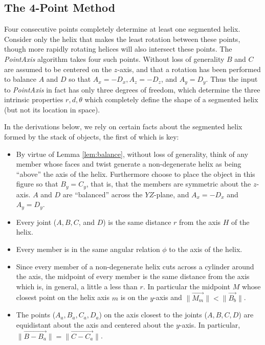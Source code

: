 \documentclass[11pt]{article}
\begin{document}
{\subsection{The 4-Point Method}

Four consecutive points completely determine at least one segmented helix.
Consider
only the helix that makes the least rotation between these points,
though more rapidly rotating helices will also intersect these points.
The {\em PointAxis} algorithm
takes four such points. Without loss of generality $B$ and $C$
are assumed to be centered on the $z$-axis, and that a
rotation has been performed to balance $A$ and $D$ so that $A_x = -D_x, A_z = -D_z$, and $A_y = D_y$. Thus the input to
{\em PointAxis} in fact has only three degrees of freedom, which determine the three intrinsic properties $r,d,\theta$
which completely define the shape of a segmented helix (but not its location in space).


In the derivations below, we rely on certain facts about
the segmented helix formed by the stack of objects, the first
of which is key:
\begin{itemize}
\item By virtue of Lemma \ref{lem:balance}, without loss of generality, think of any member whose faces
  and twist generate a non-degenerate helix as being ``above'' the
  axis of the helix. Furthermore choose to place the object in
  this figure so that $B_y = C_y$, that is, that the members are symmetric
  about the $z$-axis.
  $A$ and $D$ are ``balanced'' across the $YZ$-plane,
  and $A_x = -D_x$ and $A_y = D_y$.
\item Every joint ($A,B,C$, and $D$) is the same distance $r$ from the axis $H$ of the helix.
\item Every member is in the same angular relation $\phi$ to the axis of the helix.
\item Since every member of a non-degenerate helix cuts across a cylinder around the axis,
  the midpoint of every member is the same distance from the axis
  which is, in general, a little a less than $r$. In particular the midpoint $M$
  whose closest point on the helix axis $m$ is on the $y$-axis and
  $\| \overrightarrow{M_m} \| < \| \overrightarrow{B_b} \|$.
\item The points ($A_a,B_a,C_a,D_a$) on the axis closest to the joints ($A,B,C,D$)
  are equidistant about the axis and centered about the $y$-axis. In
  particular, $\| \overrightarrow{B - B_a} \| = \| \overrightarrow{C - C_a} \|$.
\end{itemize}

}
\end{document}
